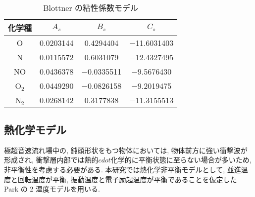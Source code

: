 　
     \begin{table}[!htbp]
      \begin{center}
       \caption{Blottner の粘性係数モデル \cite{blottner}}
        \begin{tabular}{c c c c} \hline \hline
                        化学種 & $A_s$ & $B_s$ & $C_s$ \\ \hline 
                             O    & 0.0203144 & 0.4294404 & $-$11.6031403 \\
                             N    & 0.0115572 & 0.6031079 & $-$12.4327495 \\
                             NO   & 0.0436378 &$-$0.0335511 &  $-$9.5676430 \\
                             O$_2$& 0.0449290 &$-$0.0826158 &  $-$9.2019475 \\
                             N$_2$& 0.0268142 & 0.3177838 & $-$11.3155513 \\ 
                             \hline \hline
        \end{tabular}
       \label{tab:blocoef}
      \end{center}
     \end{table} 

\subsection{熱化学モデル}
極超音速流れ場中の,
鈍頭形状をもつ物体においては,
物体前方に強い衝撃波が形成され,
衝撃層内部では熱的$cdot$化学的に平衡状態に至らない場合が多いため,
非平衡性を考慮する必要がある.
本研究では熱化学非平衡モデルとして,
並進温度と回転温度が平衡,
振動温度と電子励起温度が平衡であることを仮定した Park の 2 温度モデル\cite{park}を用いる.

